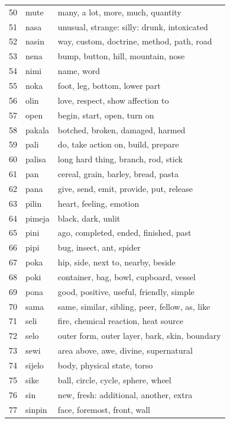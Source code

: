\documentclass[11pt]{article}
\begin{document}
{\begin{multicols}{2}[]
\columnbreak
\begin{center}
\begin{tabularx}{\linewidth}{rlX}
50 & mute & many, a lot, more, much, quantity\\
51 & nasa & unusual, strange: silly: drunk, intoxicated\\
52 & nasin & way, custom, doctrine, method, path, road\\
53 & nena & bump, button, hill, mountain, nose\\
54 & nimi & name, word\\
55 & noka & foot, leg, bottom, lower part\\
56 & olin & love, respect, show affection to\\
57 & open & begin, start, open, turn on\\
58 & pakala & botched, broken, damaged, harmed\\
59 & pali & do, take action on, build, prepare\\
60 & palisa & long hard thing, branch, rod, stick\\
61 & pan & cereal, grain, barley, bread, pasta\\
62 & pana & give, send, emit, provide, put, release\\
63 & pilin & heart, feeling, emotion\\
64 & pimeja & black, dark, unlit\\
65 & pini & ago, completed, ended, finished, past\\
66 & pipi & bug, insect, ant, spider\\
67 & poka & hip, side, next to, nearby, beside\\
68 & poki & container, bag, bowl, cupboard, vessel\\
69 & pona & good, positive, useful, friendly, simple\\
70 & sama & same, similar, sibling, peer, fellow, as, like\\
71 & seli & fire, chemical reaction, heat source\\
72 & selo & outer form, outer layer, bark, skin, boundary\\
73 & sewi & area above, awe, divine, supernatural\\
74 & sijelo & body, physical state, torso\\
75 & sike & ball, circle, cycle, sphere, wheel\\
76 & sin & new, fresh: additional, another, extra\\
77 & sinpin & face, foremost, front, wall\\

\end{tabularx}
\end{center}
\end{multicols}}
\end{document}
